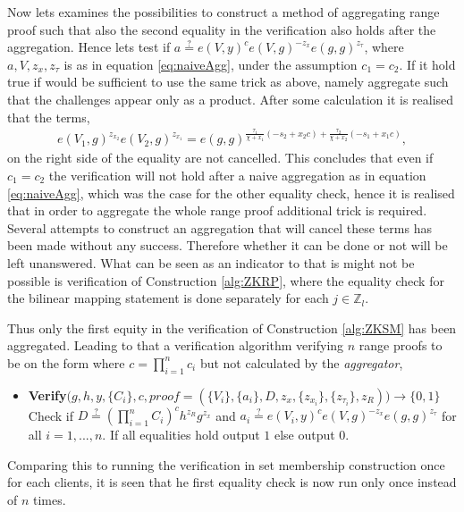 Now lets examines the possibilities to construct a method of aggregating range proof such that also the second equality in the verification also holds after the aggregation. Hence lets test if $a \overset{?}{=} e(V,y)^c e(V,g)^{-z_x}e(g,g)^{z_\tau}$, where $a,V,z_{x},z_\tau$  is as in equation \eqref{eq:naiveAgg}, under the assumption $c_1=c_2$. If it hold true if would be sufficient to use the same trick as above, namely aggregate such that the challenges appear only as a product. After some calculation it is realised that the terms,
\begin{align*}
e(V_1,g)^{z_{x_2}}e(V_2,g)^{z_{x_1}} = e(g,g)^{\frac{\tau_1}{\chi + x_1}(-s_2+x_2c) +\frac{\tau_2}{\chi + x_2}(-s_1+x_1c)   } ,
\end{align*}
on the right side of the equality are not cancelled. This concludes that even if $c_1=c_2$ the verification will not hold after a naive aggregation as in equation \eqref{eq:naiveAgg}, which was the case for the other equality check,  hence it is realised that in order to aggregate the whole range proof additional trick is required. Several attempts to construct an aggregation that will cancel these terms has been made without any success. Therefore whether it can be done or not will be left unanswered. What can be seen as an indicator to that is might not be possible is verification of Construction \ref{alg:ZKRP}, where the equality check for the bilinear mapping statement is done separately for each $j\in\mathds{Z}_l$. 




Thus  only the first equity  in the verification of Construction \ref{alg:ZKSM} has been aggregated. Leading to that a verification algorithm verifying $n$ range proofs to be on the form where $c=\prod_{i=1}^n c_i$ but not calculated by the \textit{aggregator},
\begin{itemize}
\item \textbf{Verify}$\big(g,h,y,\{C_i\},c,proof= (\{V_i\},\{a_i\}, D,z_x,\{z_{x_i}\}, \{z_{\tau_i}\}, z_R))\to \{0,1\}$\\
Check if $D \overset{?}{=}( \prod_{i=1}^n C_i )^{c}h^{z_R}g^{z_x}$ and $a_i \overset{?}{=} e(V_i,y)^ce(V,g)^{-z_x}e(g,g)^{z_\tau}$ for all $i=1,...,n$. If all equalities hold output $1$ else output $0$.
\end{itemize}
Comparing this to running the verification in set membership construction once for each clients, it is seen that he first equality check is now run only once instead of $n$ times. 

